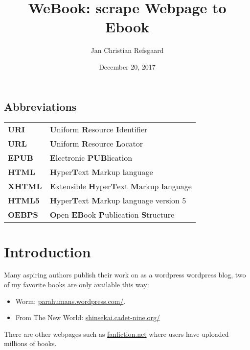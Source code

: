 \documentclass[]{report}   %
\begin{document}
					
\lstset{language=Python,upquote=true}

\title{WeBook: scrape Webpage to Ebook}
\author{Jan Christian Refsgaard}
\date{December 20, 2017}    %
\maketitle

\section*{Abbreviations}
\begin{tabular}{ l l }
	\textbf{URI}   & \textbf{U}niform \textbf{R}esource \textbf{I}dentifier \\
	\textbf{URL}   & \textbf{U}niform \textbf{R}esource \textbf{L}ocator \\
	\textbf{EPUB}  & \textbf{E}lectronic \textbf{PUB}lication  \\
	\textbf{HTML}  & \textbf{H}yper\textbf{T}ext \textbf{M}arkup \textbf{l}anguage \\
	\textbf{XHTML} & \textbf{E}xtensible \textbf{H}yper\textbf{T}ext 
					 \textbf{M}arkup \textbf{l}anguage \\
	\textbf{HTML5} & \textbf{H}yper\textbf{T}ext \textbf{M}arkup \textbf{l}anguage 
					 version 5 \\
	\textbf{OEBPS} & \textbf{O}pen \textbf{EB}ook \textbf{P}ublication \textbf{S}tructure \\
\end{tabular}

\chapter{Introduction}           
Many aspiring authors publish their work on as a wordpress wordpress blog, two
of my favorite books are only available this way:
\begin{itemize}
    \item Worm: \url{parahumans.wordpress.com/}.
    \item From The New World: \url{shinsekai.cadet-nine.org/} 
\end{itemize}
There are other webpages such as \url{fanfiction.net} where users have uploaded millions of books.
\end{document}
